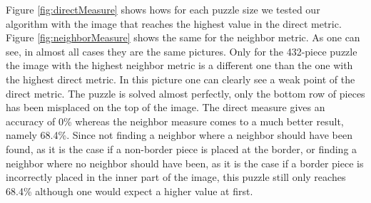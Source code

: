 \documentclass[11pt]{report}
\begin{document}
Figure \ref{fig:directMeasure} shows hows for each puzzle size we tested our
algorithm with the image that reaches the highest value in the direct metric.
Figure \ref{fig:neighborMeasure} shows the same for the neighbor metric. As one
can see, in almost all cases they are the same pictures. Only for the 432-piece
puzzle the image with the highest neighbor metric is a different one than the
one with the highest direct metric. In this picture one can clearly see a weak
point of the direct metric. The puzzle is solved almost perfectly, only the
bottom row of pieces has been misplaced on the top of the image. The direct
measure gives an accuracy of 0\% whereas the neighbor measure comes to a much
better result, namely 68.4\%. Since not finding a neighbor where a neighbor
should have been found, as it is the case if a non-border piece is placed at the
border, or finding a neighbor where no neighbor should have been,
as it is the case if a border piece is incorrectly placed in the inner part of
the image, this puzzle still only reaches 68.4\% although one would expect a
higher value at first.
\end{document}
